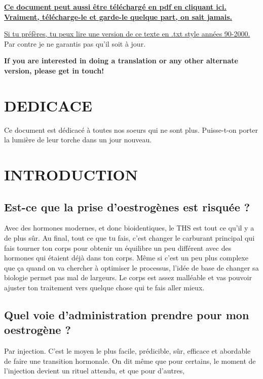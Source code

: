 \documentclass{article}
\begin{document}
\noindent\textbf{\href{pghrt.pdf}{Ce document peut aussi être téléchargé en pdf en cliquant ici. Vraiment, télécharge-le et garde-le quelque part, on sait jamais.}}

\noindent\href{pghrtgretchensversion.txt}{Si tu préfères, tu peux lire une version de ce texte en .txt style années 90-2000.} Par contre je ne garantis pas qu'il soit à jour.

\noindent\textbf{If you are interested in doing a translation or any other alternate version, please get in touch!}



\section*{DEDICACE}

Ce document est dédicacé à toutes nos soeurs qui ne sont plus. Puisse-t-on porter la lumière de leur torche dans un jour nouveau.

\section{INTRODUCTION}

\subsection{Est-ce que la prise d'oestrogènes est risquée ?}

Avec des hormones modernes, et donc bioidentiques, le THS est tout ce qu'il y a de plus sûr. Au final, tout ce que tu fais, c'est changer le carburant principal qui fais tourner ton corps pour obtenir un équilibre un peu différent avec des hormones qui étaient déjà dans ton corps. Même si c'est un peu plus complexe que ça quand on va chercher à optimiser le processus, l'idée de base de changer sa biologie permet pas mal de largeurs. Le corps est assez malléable et vas pouvoir ajuster ton traitement vers quelque chose qui te fais aller mieux.

\subsection{Quel voie d'administration prendre pour mon oestrogène ?}

Par injection. C'est le moyen le plus facile, prédicible, sûr, efficace et abordable de faire une transition hormonale. On dit même que pour certains, le moment de l'injection devient un rituel attendu, et que pour d'autres,  
\end{document}

